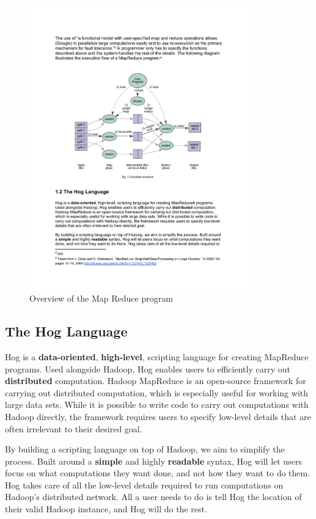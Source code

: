 \documentclass{article}
\begin{document}
\begin{center}
\begin{figure}
  \label{fig:map_reduce_overview}
  \includegraphics[width=0.85\textwidth]{img/map_reduce_overview.pdf}
  \caption{Overview of the Map Reduce program}
\end{figure}
\end{center}

\subsection{The Hog Language}
\label{sub:hog_language}

Hog is a \textbf{data-oriented}, \textbf{high-level}, scripting language for
creating MapReduce programs. Used alongside Hadoop, Hog enables users to
efficiently carry out \textbf{distributed} computation. Hadoop MapReduce is an
open-source framework for carrying out distributed computation, which is especially
useful for working with large data sets. While it is possible to write code to
carry out computations with Hadoop directly, the framework requires users to
specify low-level details that are often irrelevant to their desired goal.

By building a scripting language on top of Hadoop, we aim to simplify the process.
Built around a \textbf{simple} and highly \textbf{readable} syntax, Hog will let
users focus on what computations they want done, and not how they want to do them.
Hog takes care of all the low-level details required to run computations on
Hadoop’s distributed network. All a user needs to do is tell Hog the location of
their valid Hadoop instance, and Hog will do the rest.
\end{document}

